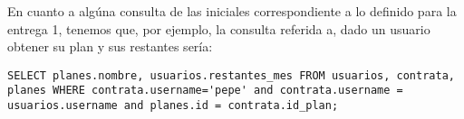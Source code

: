 \documentclass[letter]{article}
\begin{document}
\begin{pregunta}{1}
		En cuanto a algúna consulta de las iniciales correspondiente a lo definido para la entrega 1, tenemos que, por ejemplo, la consulta referida a, dado un usuario obtener su plan y sus restantes sería:
		\begin{lstlisting}
SELECT planes.nombre, usuarios.restantes_mes FROM usuarios, contrata, planes WHERE contrata.username='pepe' and contrata.username = usuarios.username and planes.id = contrata.id_plan;
		\end{lstlisting}
	\end{pregunta}
\end{document}
